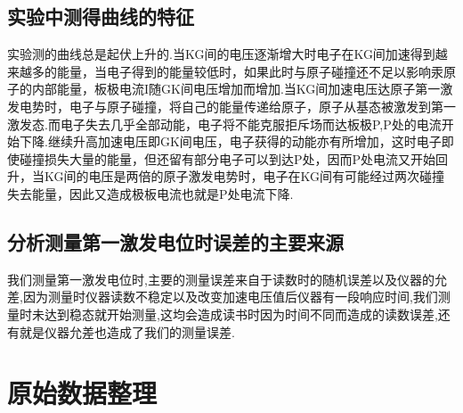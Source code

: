 \documentclass[a4 paper,12pt]{article}
\begin{document}
\subsection{实验中测得曲线的特征}
实验测的曲线总是起伏上升的.当KG间的电压逐渐增大时电子在KG间加速得到越来越多的能量，当电子得到的能量较低时，如果此时与原子碰撞还不足以影响汞原子的内部能量，板极电流I随GK间电压增加而增加.当KG间加速电压达原子第一激发电势时，电子与原子碰撞，将自己的能量传递给原子，原子从基态被激发到第一激发态.而电子失去几乎全部动能，电子将不能克服拒斥场而达板极P,P处的电流开始下降.继续升高加速电压即GK间电压，电子获得的动能亦有所增加，这时电子即使碰撞损失大量的能量，但还留有部分电子可以到达P处，因而P处电流又开始回升，当KG间的电压是两倍的原子激发电势时，电子在KG间有可能经过两次碰撞失去能量，因此又造成极板电流也就是P处电流下降.
\subsection{分析测量第一激发电位时误差的主要来源}
我们测量第一激发电位时,主要的测量误差来自于读数时的随机误差以及仪器的允差,因为测量时仪器读数不稳定以及改变加速电压值后仪器有一段响应时间,我们测量时未达到稳态就开始测量,这均会造成读书时因为时间不同而造成的读数误差,还有就是仪器允差也造成了我们的测量误差.
\section{原始数据整理}
\end{document}
